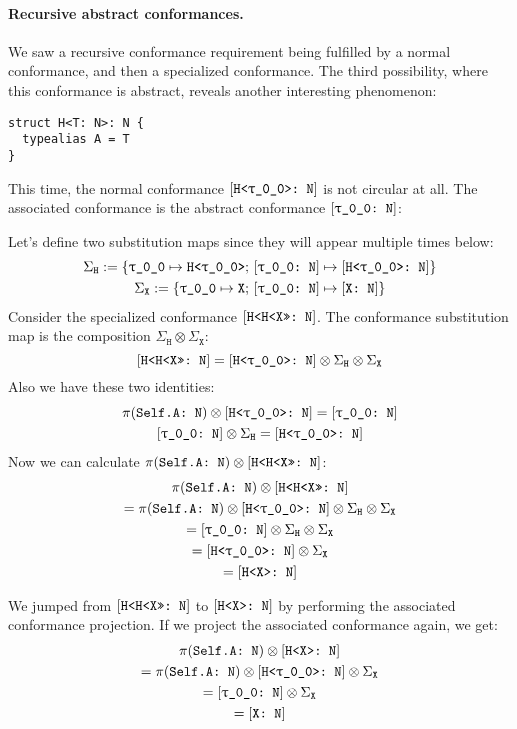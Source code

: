 \documentclass[../generics]{subfiles}
\begin{document}
\paragraph{Recursive abstract conformances.}
We saw a recursive conformance requirement being fulfilled by a normal conformance, and then a specialized conformance. The third possibility, where this conformance is abstract, reveals another interesting phenomenon:
\begin{Verbatim}
struct H<T: N>: N {
  typealias A = T
}
\end{Verbatim}
This time, the normal conformance $\ConfReq{H<\rT>}{N}$ is not circular at all. The associated conformance is the abstract conformance $\ConfReq{\rT}{N}$:
\begin{center}
\end{center}
Let's define two substitution maps since they will appear multiple times below:
\begin{gather*}
\Sigma_\texttt{H} := \SubstMapC{\SubstType{\rT}{H<\rT>}}{\SubstConf{\rT}{H<\rT>}{N}}\\
\Sigma_\texttt{X} := \SubstMapC{\SubstType{\rT}{X}}{\SubstConf{\rT}{X}{N}}
\end{gather*}
Consider the specialized conformance $[\texttt{H<H<X>>:~N}]$. The conformance substitution map is the composition $\Sigma_{\texttt{H}}\otimes \Sigma_{\texttt{X}}$:
\[\ConfReq{H<H<X>>}{N} = \ConfReq{H<\rT>}{N}\otimes \Sigma_{\texttt{H}}\otimes \Sigma_{\texttt{X}}\]
Also we have these two identities:
\begin{gather*}
\SelfAToN \otimes \ConfReq{H<\rT>}{N} = \ConfReq{\rT}{N}\\
\ConfReq{\rT}{N} \otimes \Sigma_{\texttt{H}} = \ConfReq{H<\rT>}{N}
\end{gather*}
Now we can calculate $\pi(\texttt{Self.A:~N})\otimes[\texttt{H<H<X>>:~N}]$:
\begin{gather*}
\SelfAToN \otimes \ConfReq{H<H<X>>}{N}\\
= \SelfAToN \otimes \ConfReq{H<\rT>}{N} \otimes \Sigma_{\texttt{H}}\otimes \Sigma_{\texttt{X}} \\
= \ConfReq{\rT}{N} \otimes \Sigma_{\texttt{H}}\otimes \Sigma_{\texttt{X}} \\
= \ConfReq{H<\rT>}{N} \otimes \Sigma_{\texttt{X}}\\
= \ConfReq{H<X>}{N}
\end{gather*}

We jumped from $[\texttt{H<H<X>>:~N}]$ to $[\texttt{H<X>:~N}]$ by performing the associated conformance projection. If we project the associated conformance again, we get:
\begin{gather*}
\SelfAToN \otimes \ConfReq{H<X>}{N}\\
= \SelfAToN \otimes \ConfReq{H<\rT>}{N} \otimes \Sigma_{\texttt{X}}\\
= \ConfReq{\rT}{N} \otimes \Sigma_{\texttt{X}}\\
= \ConfReq{X}{N}
\end{gather*}
\end{document}

